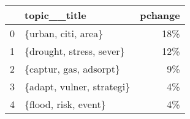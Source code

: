 \begin{tabular}{llr}
\toprule
{} &               topic\_\_title &  pchange \\
\midrule
0 &        \{urban, citi, area\} &      18\% \\
1 &   \{drought, stress, sever\} &      12\% \\
2 &     \{captur, gas, adsorpt\} &       9\% \\
3 &  \{adapt, vulner, strategi\} &       4\% \\
4 &       \{flood, risk, event\} &       4\% \\
\bottomrule
\end{tabular}
